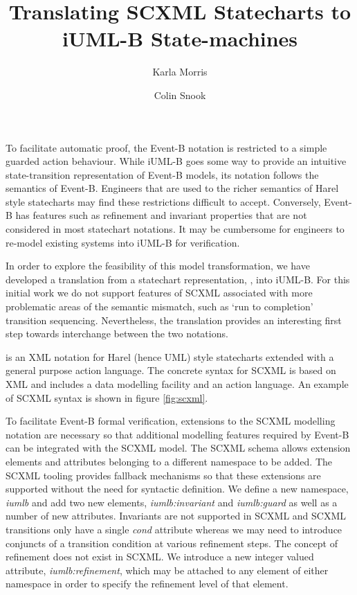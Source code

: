 \documentclass{llncs}
\title{Translating SCXML Statecharts to iUML-B State-machines}
\author{
Karla Morris\inst{1}
\and
Colin Snook\inst{2}
}
\institute{
  Sandia National Laboratories, 
  Livermore, California, U.S.A.\\
  \email{knmorri@sandia.gov}
\and
   University of Southampton,
   Southampton, United Kingdom\\
   \email{cfs@ecs.soton.ac.uk}\\
 }
\begin{document}
\maketitle

\pagestyle{empty}

To facilitate automatic proof, the Event-B notation is restricted to a simple guarded action behaviour.
While iUML-B goes some way to provide an intuitive state-transition representation of Event-B models, its notation follows the semantics of Event-B.
Engineers that are used to the richer semantics of Harel style statecharts may find these restrictions difficult to accept.
Conversely, Event-B has features such as refinement and invariant properties that are not considered in most statechart notations.
It may be cumbersome for engineers to re-model existing systems into iUML-B for verification. 

  In order to explore the feasibility of this model transformation, we have developed a translation from a statechart representation, \SCXML \cite{scxmlwebsite}, into iUML-B. 
  For this initial work we do not support features of SCXML associated with more problematic areas of the semantic mismatch, such as `run to completion' transition sequencing. 
  Nevertheless, the translation provides an interesting first step towards interchange between the two notations.

 \SCXML is an XML notation for Harel (hence UML) style statecharts extended with a general purpose action language.
The concrete syntax for SCXML is based on XML  and includes a data modelling facility and an action language.
An example of SCXML syntax is shown in figure \ref{fig:scxml}.

To facilitate Event-B formal verification, extensions to the SCXML 
modelling notation are necessary so that additional modelling features 
required by Event-B can be integrated with the SCXML model.
The SCXML schema allows extension elements and attributes belonging 
to a different namespace to be added. 
The SCXML tooling provides fallback mechanisms so that these extensions are supported 
without the need for syntactic definition. We define a new namespace,  
\emph{iumlb} and add two new elements, \emph{iumlb:invariant} and 
\emph{iumlb:guard} as well as a 
number of new attributes.
Invariants are not supported in SCXML and SCXML transitions only have a single \emph{cond} attribute whereas we may need to introduce conjuncts of a transition
condition at various refinement steps. 
The concept  of refinement does not exist in SCXML. 
We introduce a new integer valued  attribute, \emph{iumlb:refinement}, which may be attached to any element of 
either namespace in order to specify the refinement level of that element. 
\end{document}
